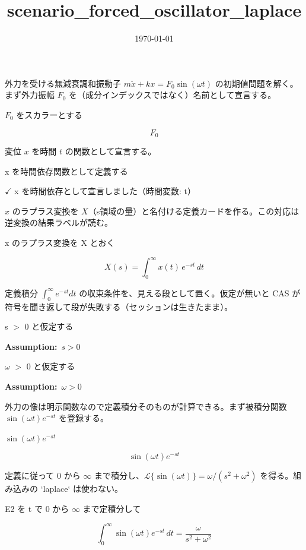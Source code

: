 \documentclass[dvipdfmx,a4paper,11pt]{jsarticle}
\title{scenario\_forced\_oscillator\_laplace}
\date{\today}
\begin{document}
\maketitle

外力を受ける無減衰調和振動子 $m\ddot x + kx = F_0\sin(\omega t)$ の初期値問題を解く。まず外力振幅 $F_0$ を（成分インデックスではなく）名前として宣言する。

$F_0$ をスカラーとする

\[
  F_0
\]

変位 $x$ を時間 $t$ の関数として宣言する。

x を時間依存関数として定義する

$\checkmark$ x を時間依存として宣言しました（時間変数: t）

$x$ のラプラス変換を $X$（s領域の量）と名付ける定義カードを作る。この対応は逆変換の結果ラベルが読む。

x のラプラス変換を X とおく

\begin{equation}
  X(s) = \int_0^{\infty} x(t)\, e^{-s t}\, dt
  \label{eq:E1}
\end{equation}

定義積分 $\int_0^\infty e^{-st}dt$ の収束条件を、見える段として置く。仮定が無いと CAS が符号を聞き返して段が失敗する（セッションは生きたまま）。

s $>$ 0 と仮定する

\noindent\textbf{Assumption:}\ $\displaystyle s > 0$\par

$\omega$ $>$ 0 と仮定する

\noindent\textbf{Assumption:}\ $\displaystyle \omega > 0$\par

外力の像は明示関数なので定義積分そのものが計算できる。まず被積分関数 $\sin(\omega t)e^{-st}$ を登録する。

$\sin(\omega t) e^{-s t}$

\begin{equation}
  \sin(\omega t) e^{-s t}
  \label{eq:E2}
\end{equation}

定義に従って $0$ から $\infty$ まで積分し、$\mathcal L\{\sin(\omega t)\} = \omega/(s^2+\omega^2)$ を得る。組み込みの `laplace` は使わない。

E2 を t で 0 から $\infty$ まで定積分して

\begin{equation}
  \int_{0}^{\infty} \sin(\omega t) e^{-s t} \, dt = \frac{\omega}{s^2+\omega^2}
  \label{eq:E3}
\end{equation}
\end{document}
